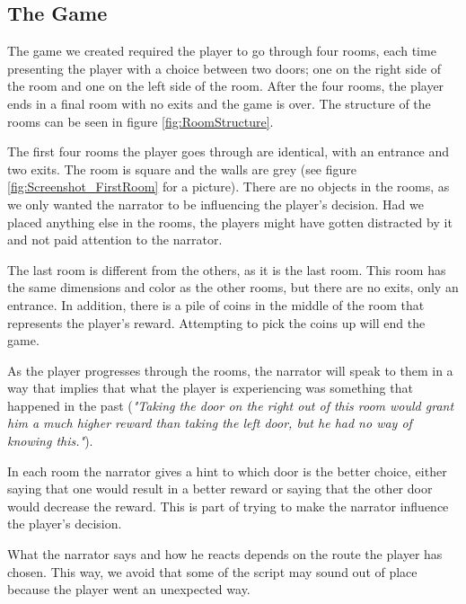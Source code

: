 \subsection{The Game}
\label{Method_Game}

The game we created required the player to go through four rooms, each time presenting the player with a choice between two doors; one on the right side of the room and one on the left side of the room. After the four rooms, the player ends in a final room with no exits and the game is over. The structure of the rooms can be seen in figure \ref{fig:RoomStructure}.


The first four rooms the player goes through are identical, with an entrance and two exits. The room is square and the walls are grey (see figure \ref{fig:Screenshot_FirstRoom} for a picture). There are no objects in the rooms, as we only wanted the narrator to be influencing the player's decision. Had we placed anything else in the rooms, the players might have gotten distracted by it and not paid attention to the narrator.


The last room is different from the others, as it is the last room. This room has the same dimensions and color as the other rooms, but there are no exits, only an entrance. In addition, there is a pile of coins in the middle of the room that represents the player's reward. Attempting to pick the coins up will end the game.

As the player progresses through the rooms, the narrator will speak to them in a way that implies that what the player is experiencing was something that happened in the past (\textit{"Taking the door on the right out of this room would grant him a much higher reward than taking the left door, but he had no way of knowing this."}).

In each room the narrator gives a hint to which door is the better choice, either saying that one would result in a better reward or saying that the other door would decrease the reward. This is part of trying to make the narrator influence the player's decision.

What the narrator says and how he reacts depends on the route the player has chosen. This way, we avoid that some of the script may sound out of place because the player went an unexpected way.

